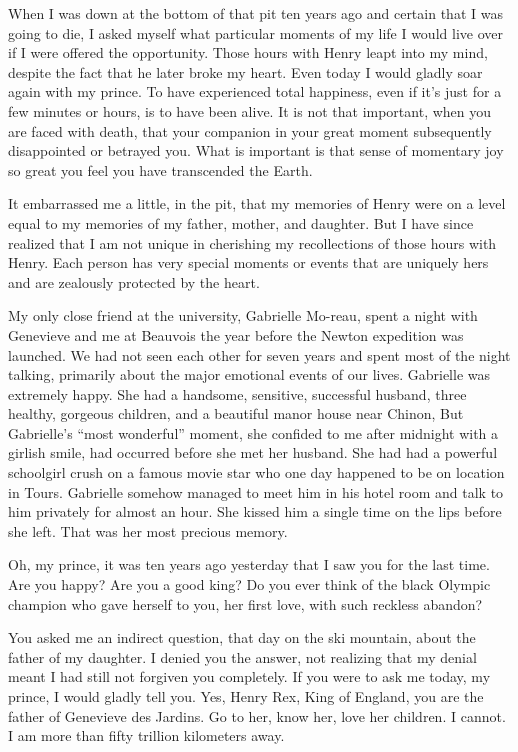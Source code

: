 \documentclass[]{article}
\begin{document}
{When I was down at the bottom of that pit ten years ago and certain that I was going to die, I asked myself what particular moments of my life I would live over if I were offered the opportunity. Those hours with Henry leapt into my mind, despite the fact that he later broke my heart. Even today I would gladly soar again with my prince. To have experienced total happiness, even if it’s just for a few minutes or hours, is to have been alive. It is not that important, when you are faced with death, that your companion in your great moment subsequently disappointed or betrayed you. What is important is that sense of momentary joy so great you feel you have transcended the Earth.

It embarrassed me a little, in the pit, that my memories of Henry were on a level equal to my memories of my father, mother, and daughter. But I have since realized that I am not unique in cherishing my recollections of those hours with Henry. Each person has very special moments or events that are uniquely hers and are zealously protected by the heart.

My only close friend at the university, Gabrielle Mo-reau, spent a night with Genevieve and me at Beauvois the year before the Newton expedition was launched. We had not seen each other for seven years and spent most of the night talking, primarily about the major emotional events of our lives. Gabrielle was extremely happy. She had a handsome, sensitive, successful husband, three healthy, gorgeous children, and a beautiful manor house near Chinon, But Gabrielle’s “most wonderful” moment, she confided to me after midnight with a girlish smile, had occurred before she met her husband. She had had a powerful schoolgirl crush on a famous movie star who one day happened to be on location in Tours. Gabrielle somehow managed to meet him in his hotel room and talk to him privately for almost an hour. She kissed him a single time on the lips before she left. That was her most precious memory.

Oh, my prince, it was ten years ago yesterday that I saw you for the last time. Are you happy? Are you a good king? Do you ever think of the black Olympic champion who gave herself to you, her first love, with such reckless abandon?

You asked me an indirect question, that day on the ski mountain, about the father of my daughter. I denied you the answer, not realizing that my denial meant I had still not forgiven you completely. If you were to ask me today, my prince, I would gladly tell you. Yes, Henry Rex, King of England, you are the father of Genevieve des Jardins. Go to her, know her, love her children. I cannot. I am more than fifty trillion kilometers away.

}
\end{document}
